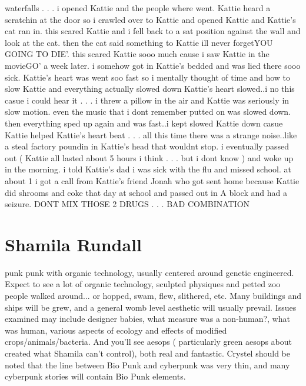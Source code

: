 \documentclass[12pt]{book}
\begin{document}
waterfalls . . .  i opened Kattie and the people where went. Kattie heard a scratchin at the door so i crawled over to Kattie and opened Kattie and Kattie's cat ran in. this scared Kattie and i fell back to a sat position against the wall and look at the cat. then the cat said something to Kattie ill never forgetYOU GOING TO DIE'. this scared Kattie sooo much cause i saw Kattie in the movieGO' a week later. i somehow got in Kattie's bedded and was lied there sooo sick. Kattie's heart was went soo fast so i mentally thought of time and how to slow Kattie and everything actually slowed down Kattie's heart slowed..i no this casue i could hear it . . .  i threw a pillow in the air and Kattie was seriously in slow motion. even the music that i dont remember putted on was slowed down. then everything sped up again and was fast..i kept slowed Kattie down casue Kattie helped Kattie's heart beat . . .  all this time there was a strange noise..like a steal factory poundin in Kattie's head that wouldnt stop. i eventually passed out ( Kattie all lasted about 5 hours i think . . .  but i dont know ) and woke up in the morning. i told Kattie's dad i was sick with the flu and missed school. at about 1 i got a call from Kattie's friend Jonah who got sent home because Kattie did shrooms and coke that day at school and passed out in A block and had a seizure. DONT MIX THOSE 2 DRUGS . . .  BAD COMBINATION



\chapter{Shamila Rundall}

punk punk with organic technology, usually centered around genetic engineered. Expect to see a lot of organic technology, sculpted physiques and petted zoo people walked around... or hopped, swam, flew, slithered, etc. Many buildings and ships will be grew, and a general womb level aesthetic will usually prevail. Issues examined may include designer babies, what measure was a non-human?, what was human, various aspects of ecology and effects of modified crops/animals/bacteria. And you'll see aesops ( particularly green aesops about created what Shamila can't control), both real and fantastic. Crystel should be noted that the line between Bio Punk and cyberpunk was very thin, and many cyberpunk stories will contain Bio Punk elements.
\end{document}
